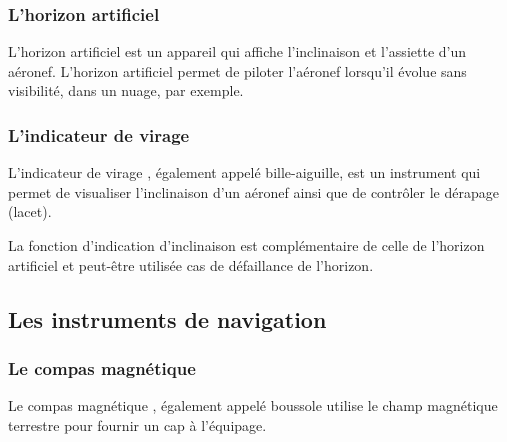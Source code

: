 	
	\subsubsection{L'horizon artificiel}
	L'\gls{horizon artificiel}  est un appareil qui affiche l'inclinaison et l'assiette d'un aéronef. L'horizon artificiel permet de piloter l'aéronef lorsqu'il évolue sans visibilité, dans un nuage, par exemple.
	
	\begin{figure}[H]	
	\centering
	\end{figure}
	
	\subsubsection{L'indicateur de virage}
	L'\gls{indicateur de virage} , également appelé bille-aiguille, est un instrument qui permet de visualiser l'inclinaison d'un aéronef ainsi que de contrôler le dérapage (lacet).
	
	La fonction d'indication d'inclinaison est complémentaire de celle de l'horizon artificiel et peut-être utilisée cas de défaillance de l'horizon.
	
	\begin{figure}[H]	
	\centering
	\end{figure}
	
	
	\subsection{Les instruments de navigation}
	\subsubsection{Le compas magnétique}	
	Le \gls{compas magnétique} , également appelé \gls{boussole} utilise le champ magnétique terrestre pour fournir un cap à l'équipage.
	
